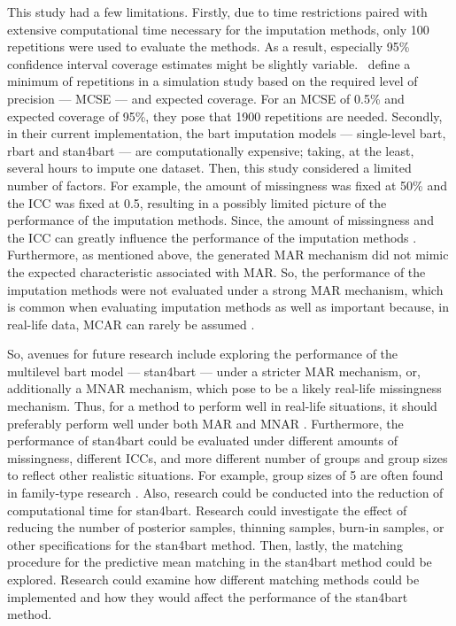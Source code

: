 \documentclass[10pt, a4paper, titlepage]{article}
\begin{document}
This study had a few limitations. Firstly, due to time restrictions paired with extensive computational time necessary for the imputation methods, only 100 repetitions were used to evaluate the methods. As a result, especially 95\% confidence interval coverage estimates might be slightly variable.~\citet{morris2019} define a minimum of repetitions in a simulation study based on the required level of precision --- MCSE --- and expected coverage. For an MCSE of 0.5\% and expected coverage of 95\%, they pose that 1900 repetitions are needed. Secondly, in their current implementation, the bart imputation models --- single-level bart, rbart and stan4bart --- are computationally expensive; taking, at the least, several hours to impute one dataset. Then, this study considered a limited number of factors. For example, the amount of missingness was fixed at 50\% and the ICC was fixed at 0.5, resulting in a possibly limited picture of the performance of the imputation methods. Since, the amount of missingness and the ICC can greatly influence the performance of the imputation methods \citep{enders2018,enders2018a,enders2020,mistler2017,akkayahocagil2023,grund2016,grund2018a,grund2018,ludtke2017,grund2021}. Furthermore, as mentioned above, the generated MAR mechanism did not mimic the expected characteristic associated with MAR. So, the performance of the imputation methods were not evaluated under a strong MAR mechanism, which is common when evaluating imputation methods \citep{buurenFlexibleImputationMissing2018,enders2018a,peeters2015,austin2021,carpenter2013,little2002,grund2018,ludtke2017,grund2021,schouten2021} as well as important because, in real-life data, MCAR can rarely be assumed \citep{oberman2023,buurenFlexibleImputationMissing2018,kang2013,little2002}.

So, avenues for future research include exploring the performance of the multilevel bart model --- stan4bart --- under a stricter MAR mechanism, or, additionally a MNAR mechanism, which \citet{oberman2023} pose to be a likely real-life missingness mechanism. Thus, for a method to perform well in real-life situations, it should preferably perform well under both MAR and MNAR \citep{oberman2023}. Furthermore, the performance of stan4bart could be evaluated under different amounts of missingness, different ICCs, and more different number of groups and group sizes to reflect other realistic situations. For example, group sizes of 5 are often found in family-type research \citep{maas2005}. Also, research could be conducted into the reduction of computational time for stan4bart. Research could investigate the effect of reducing the number of posterior samples, thinning samples, burn-in samples, or other specifications for the stan4bart method. Then, lastly, the matching procedure for the predictive mean matching in the stan4bart method could be explored. Research could examine how different matching methods \citep{buurenFlexibleImputationMissing2018} could be implemented and how they would affect the performance of the stan4bart method.
\end{document}

